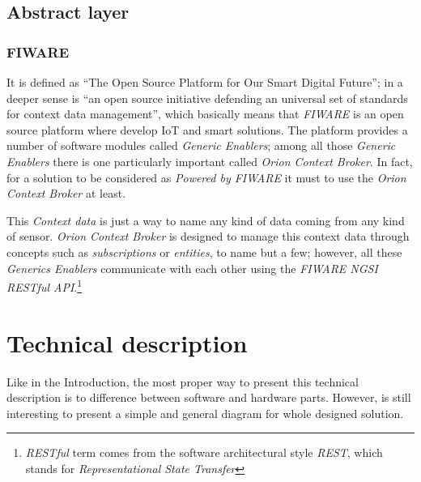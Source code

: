 \documentclass[11pt,a4paper,dvipsnames,twoside]{article}
\begin{document}
\subsection{Abstract layer}

\subsubsection{FIWARE}
It is defined as \enquote{The Open Source Platform for Our Smart Digital Future}\cite{Fiware}; in a deeper sense is \enquote{an open source initiative defending an universal set of standards for context data management}\cite{Fiware}, which basically means that \textit{FIWARE} is an open source platform where develop IoT and smart solutions. The platform provides a number of software modules called \textit{Generic Enablers}; among all those \textit{Generic Enablers} there is one particularly important called \textit{Orion Context Broker}. In fact, for a solution to be considered as \textit{Powered by FIWARE} it must to use the \textit{Orion Context Broker} at least. 

This \textit{Context data} is just a way to name any kind of data coming from any kind of sensor. \textit{Orion Context Broker} is designed to manage this context data through concepts such as \textit{subscriptions} or \textit{entities}, to name but a few; however, all these \textit{Generics Enablers} communicate with each other using the \textit{FIWARE NGSI RESTful API}\cite{NGSI}.\footnote{\textit{RESTful} term comes from the software architectural style \textit{REST}, which stands for \textit{Representational State Transfer}}

\newpage
\section{Technical description}
Like in the Introduction, the most proper way to present this technical description is to difference between software and hardware parts. However, is still interesting to present a simple and general diagram for whole designed solution.
\end{document}
